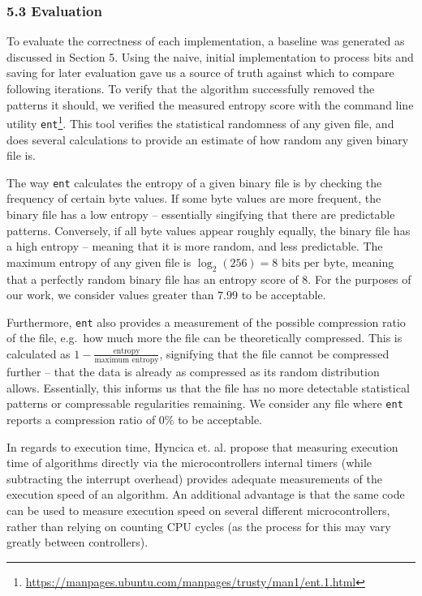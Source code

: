 \documentclass{sigchi}
\begin{document}
\subsubsection{5.3 Evaluation}\label{evaluation}

To evaluate the correctness of each implementation, a baseline was generated as discussed in Section 5. Using the naive, initial implementation to process bits and saving for later evaluation gave us a source of truth against which to compare following iterations. To verify that the algorithm successfully removed the patterns it should, we verified the measured entropy score with the command line utility \texttt{ent}\footnote{\url{https://manpages.ubuntu.com/manpages/trusty/man1/ent.1.html}}. This tool verifies the statistical randomness of any given file, and does several calculations to provide an estimate of how random any given binary file is.

The way \texttt{ent} calculates the entropy of a given binary file is by checking the frequency of certain byte values. If some byte values are more frequent, the binary file has a low entropy -- essentially singifying that there are predictable patterns. Conversely, if all byte values appear roughly equally, the binary file has a high entropy -- meaning that it is more random, and less predictable. The maximum entropy of any given file is \(\log_2(256) = 8 \text{ bits per byte}\), meaning that a perfectly random binary file has an entropy score of 8. For the purposes of our work, we consider values greater than \(7.99\) to be acceptable.

Furthermore, \texttt{ent} also provides a measurement of the possible compression ratio of the file, e.g.~how much more the file can be theoretically compressed. This is calculated as \(1 - \frac{\text{entropy}}{\text{maximum entropy}}\), signifying that the file cannot be compressed further -- that the data is already as compressed as its random distribution allows. Essentially, this informs us that the file has no more detectable statistical patterns or compressable regularities remaining. We consider any file where \texttt{ent} reports a compression ratio of \(0\%\) to be acceptable.

In regards to execution time, Hyncica et. al. \cite{micromeasurements} propose that measuring execution time of algorithms directly via the microcontrollers internal timers (while subtracting the interrupt overhead) provides adequate measurements of the execution speed of an algorithm. An additional advantage is that the same code can be used to measure execution speed on several different microcontrollers, rather than relying on counting CPU cycles (as the process for this may vary greatly between controllers).
\end{document}
